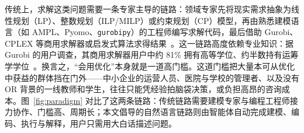 \documentclass[11pt]{article}
\begin{document}
传统上，求解这类问题需要一条专家主导的链路：领域专家先将现实需求抽象为线性规划（LP）、整数规划（ILP/MILP）或约束规划（CP）模型，再由熟悉建模语言（如 AMPL、Pyomo、\texttt{gurobipy}）的工程师编写求解代码，最后借助 Gurobi、CPLEX 等商用求解器或启发式算法求得结果~\cite{ahmaditeshnizi2024optimus}。这一链路高度依赖专业知识：据 Gurobi 的用户调查，其商用求解器用户中约 81\% 拥有高等学位、约半数持有运筹学学位~\cite{ahmaditeshnizi2024optimus}。换言之，“会用优化”本身就是一道高门槛。这道门槛把大量本可从优化中获益的群体挡在门外——中小企业的运营人员、医院与学校的管理者、以及没有 OR 背景的一线教师和学生，往往只能凭经验拍脑袋决策，或负担高昂的咨询成本。图~\ref{fig:paradigm} 对比了这两条链路：传统链路需要建模专家与编程工程师接力协作、门槛高、周期长；本文倡导的自然语言链路则由智能体自动完成建模、编码、执行与解释，用户只需用大白话描述问题。
\end{document}
